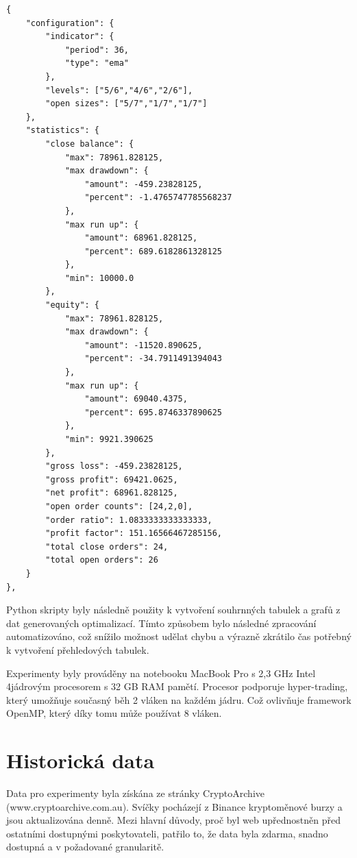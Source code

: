 \begin{lstlisting}[caption={~Informace uložené o nejlepším stavu},label={lst:best-state},captionpos=t,abovecaptionskip=-\medskipamount,belowcaptionskip=\medskipamount]
{
    "configuration": {
        "indicator": {
            "period": 36,
            "type": "ema"
        },
        "levels": ["5/6","4/6","2/6"],
        "open sizes": ["5/7","1/7","1/7"]
    },
    "statistics": {
        "close balance": {
            "max": 78961.828125,
            "max drawdown": {
                "amount": -459.23828125,
                "percent": -1.4765747785568237
            },
            "max run up": {
                "amount": 68961.828125,
                "percent": 689.6182861328125
            },
            "min": 10000.0
        },
        "equity": {
            "max": 78961.828125,
            "max drawdown": {
                "amount": -11520.890625,
                "percent": -34.7911491394043
            },
            "max run up": {
                "amount": 69040.4375,
                "percent": 695.8746337890625
            },
            "min": 9921.390625
        },
        "gross loss": -459.23828125,
        "gross profit": 69421.0625,
        "net profit": 68961.828125,
        "open order counts": [24,2,0],
        "order ratio": 1.0833333333333333,
        "profit factor": 151.16566467285156,
        "total close orders": 24,
        "total open orders": 26
    }
},
\end{lstlisting}

Python skripty byly následně použity k vytvoření souhrnných tabulek a grafů z dat generovaných optimalizací.
Tímto způsobem bylo následné zpracování automatizováno, což snížilo možnost udělat chybu a výrazně zkrátilo čas potřebný k vytvoření přehledových tabulek.

Experimenty byly prováděny na notebooku MacBook Pro s 2,3 GHz Intel 4jádrovým procesorem s 32 GB RAM pamětí.
Procesor podporuje hyper-trading, který umožňuje současný běh 2 vláken na každém jádru.
Což ovlivňuje framework OpenMP, který díky tomu může používat 8 vláken.

\section{Historická data}
Data pro experimenty byla získána ze stránky CryptoArchive (www.cryptoarchive.com.au).
Svíčky pocházejí z Binance kryptoměnové burzy a jsou aktualizována denně.
Mezi hlavní důvody, proč byl web upřednostněn před ostatními dostupnými poskytovateli, patřilo to, že data byla zdarma, snadno dostupná a v požadované granularitě.

